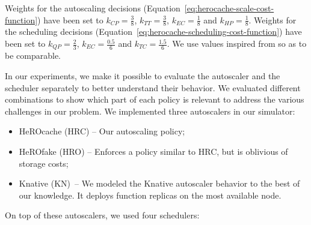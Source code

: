 Weights for the autoscaling decisions (Equation~\ref{eq:herocache-scale-cost-function}) have been set to $k_{CP} = \frac{3}{8}$, $k_{TT} = \frac{3}{8}$, $k_{EC} = \frac{1}{8}$ and $k_{HP} = \frac{1}{8}$. Weights for the scheduling decisions (Equation~\ref{eq:herocache-scheduling-cost-function}) have been set to $k_{QP} = \frac{2}{3}$, $k_{EC} = \frac{0.5}{6}$ and $k_{TC} = \frac{1.5}{6}$. We use values inspired from \cite{herofake} so as to be comparable.


In our experiments, we make it possible to evaluate the autoscaler and the scheduler separately to better understand their behavior. We evaluated different combinations to show which part of each policy is relevant to address the various challenges in our problem. We implemented three autoscalers in our simulator:

\begin{itemize}
    \item HeROcache (HRC) -- Our autoscaling policy;%
    \item HeROfake (HRO)\cite{herofake} -- Enforces a policy similar to HRC, but is oblivious of storage costs; %
    \item Knative (KN)~\cite{sureshENSUREEfficientScheduling2020}-- We modeled the Knative autoscaler behavior to the best of our knowledge. It deploys function replicas on the most available node.
\end{itemize}

On top of these autoscalers, we used four schedulers:

